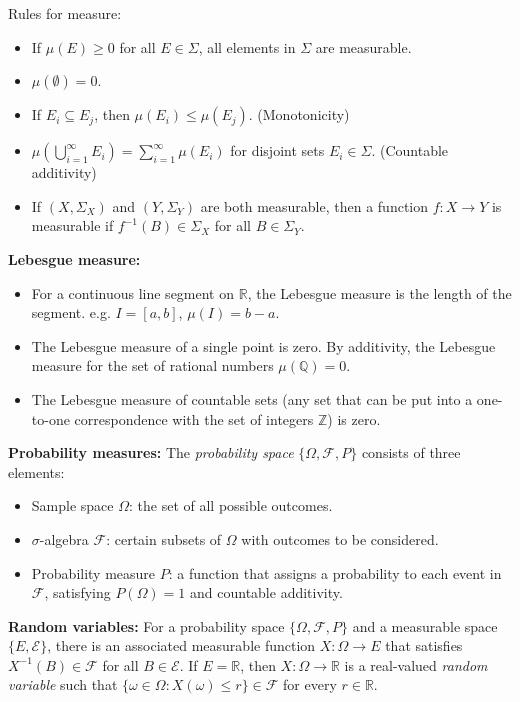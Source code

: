 \documentclass[12pt]{article}
\begin{document}
Rules for measure:
\begin{itemize}
    \item If $\mu(E) \geq 0$ for all $E \in \Sigma$, all elements in $\Sigma$ are measurable.
    \item $\mu(\emptyset) = 0$.
    \item If $E_i \subseteq E_j$, then $\mu(E_i) \leq \mu(E_j)$. (Monotonicity)
    \item $\mu \left(\bigcup_{i=1}^\infty E_i\right) = \sum_{i=1}^\infty \mu(E_i)$ for disjoint sets $E_i \in \Sigma$. (Countable additivity)
    \item If $(X, \Sigma_X)$ and $(Y, \Sigma_Y)$ are both measurable, then a function $f: X \to Y$ is measurable if $f^{-1}(B) \in \Sigma_X$ for all $B \in \Sigma_Y$.
\end{itemize}

\textbf{Lebesgue measure:}
\begin{itemize}
    \item For a continuous line segment on $\mathbb{R}$, the Lebesgue measure is the length of the segment. e.g. $I = [a, b]$, $\mu(I) = b - a$.
    \item The Lebesgue measure of a single point is zero. By additivity, the Lebesgue measure for the set of rational numbers $\mu(\mathbb{Q}) = 0$.
    \item The Lebesgue measure of countable sets (any set that can be put into a one-to-one correspondence with the set of integers $\mathbb{Z}$) is zero.
\end{itemize}

\textbf{Probability measures:} The \textit{probability space} $\{\Omega, \mathcal{F}, P\}$ consists of three elements:
\begin{itemize}
    \item Sample space $\Omega$: the set of all possible outcomes.
    \item $\sigma$-algebra $\mathcal{F}$: certain subsets of $\Omega$ with outcomes to be considered.
    \item Probability measure $P$: a function that assigns a probability to each event in $\mathcal{F}$, satisfying $P(\Omega) = 1$ and countable additivity.
\end{itemize}

\textbf{Random variables:} For a probability space $\{\Omega, \mathcal{F}, P\}$ and a measurable space $\{E, \mathcal{E}\}$, there is an associated measurable function $X: \Omega \to E$ that satisfies $X^{-1}(B) \in \mathcal{F}$ for all $B \in \mathcal{E}$. 
If $E = \mathbb{R}$, then $X: \Omega \to \mathbb{R}$ is a real-valued \textit{random variable} such that $\{\omega \in \Omega : X(\omega) \leq r\} \in \mathcal{F}$ for every $r \in \mathbb{R}$.
\end{document}
